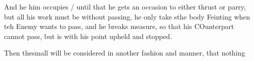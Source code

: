 And he him occupies / until that he gets an occasion to either thrust
or parry, but all his work must be without passing, he only take sthe
body Feinting when teh Enemy wants to pass, and he breaks measure, so
that his COunterpart cannot pass, but is with his point upheld and stopped.

Then thesmall will be considered in another fashion and manner, that
nothing
